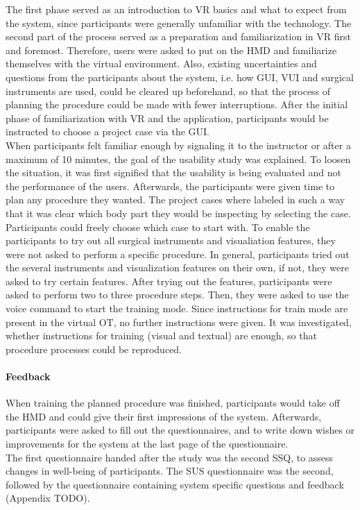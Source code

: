 The first phase served as an introduction to VR basics and what to expect from the system, since participants were generally unfamiliar with the technology.
The second part of the process served as a preparation and familiarization in VR first and foremost.
Therefore, users were asked to put on the HMD and familiarize themselves with the virtual environment.
Also, existing uncertainties and questions from the participants about the system, i.e. how GUI, VUI and surgical instruments are used, could be cleared up beforehand, so that the process of 
planning the procedure could be made with fewer interruptions.
After the initial phase of familiarization with VR and the application, participants would be instructed to choose a project case via the GUI.
\\ When participants felt familiar enough by signaling it to the instructor or after a maximum of 10 minutes, the goal of the usability study was explained.
To loosen the situation, it was first signified that the usability is being evaluated and not the performance of the users.
Afterwards, the participants were given time to plan any procedure they wanted.
The project cases where labeled in such a way that it was clear which body part they would be inspecting by selecting the case.
Participants could freely choose which case to start with.
To enable the participants to try out all surgical instruments and visualiation features, they were not asked to perform a specific procedure.
In general, participants tried out the several instruments and visualization features on their own, if not, they were asked to try certain features.
After trying out the features, participants were asked to perform two to three procedure steps.
Then, they were asked to use the voice command to start the training mode.
Since instructions for train mode are present in the virtual OT, no further instructions were given.
It was investigated, whether instructions for training (visual and textual) are enough, so that procedure processes could be reproduced.

\paragraph{\textbf{Feedback}}

When training the planned procedure was finished, participants would take off the HMD and could give their first impressions of the system.
Afterwards, participants were asked to fill out the questionnaires, and to write down wishes or improvements for the system at the last page of the questionnaire.
\\ The first questionnaire handed after the study was the second SSQ, to assess changes in well-being of participants.
The SUS questionnaire was the second, followed by the questionnaire containing system specific questions and feedback (Appendix TODO).
